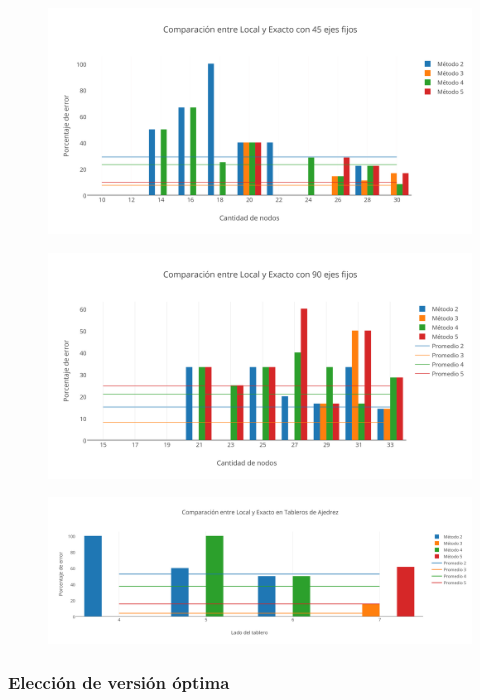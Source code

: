 \newpage

  \begin{figure}[h!]
   \begin{center}
 	\includegraphics[scale=0.7]{imagenes/local/exacto/45ejes.png}
   \end{center}
 \end{figure} 
 
  \begin{figure}[h!]
   \begin{center}
 	\includegraphics[scale=0.7]{imagenes/local/exacto/90ejes.png}
   \end{center}
 \end{figure} 
 
  \begin{figure}[h!]
   \begin{center}
 	\includegraphics[scale=0.55]{imagenes/local/exacto/tableros.png}
   \end{center}
 \end{figure} 
 
\newpage 
 
\subsubsection{Elecci\'on de versi\'on \'optima}

\newpage